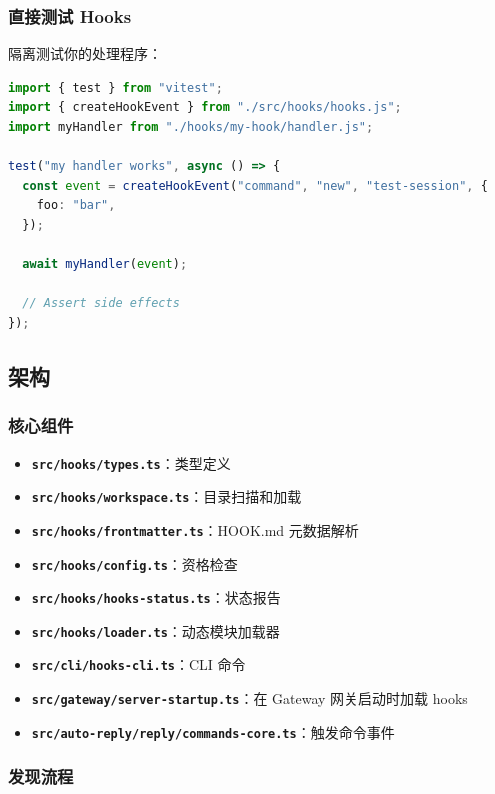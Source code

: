 \subsubsection{直接测试 Hooks}


隔离测试你的处理程序：

\begin{lstlisting}[language=typescript]
import { test } from "vitest";
import { createHookEvent } from "./src/hooks/hooks.js";
import myHandler from "./hooks/my-hook/handler.js";

test("my handler works", async () => {
  const event = createHookEvent("command", "new", "test-session", {
    foo: "bar",
  });

  await myHandler(event);

  // Assert side effects
});
\end{lstlisting}


\subsection{架构}


\subsubsection{核心组件}


\begin{itemize}
  \item \textbf{\texttt{src/hooks/types.ts}}：类型定义
  \item \textbf{\texttt{src/hooks/workspace.ts}}：目录扫描和加载
  \item \textbf{\texttt{src/hooks/frontmatter.ts}}：HOOK.md 元数据解析
  \item \textbf{\texttt{src/hooks/config.ts}}：资格检查
  \item \textbf{\texttt{src/hooks/hooks-status.ts}}：状态报告
  \item \textbf{\texttt{src/hooks/loader.ts}}：动态模块加载器
  \item \textbf{\texttt{src/cli/hooks-cli.ts}}：CLI 命令
  \item \textbf{\texttt{src/gateway/server-startup.ts}}：在 Gateway 网关启动时加载 hooks
  \item \textbf{\texttt{src/auto-reply/reply/commands-core.ts}}：触发命令事件
\end{itemize}


\subsubsection{发现流程}


